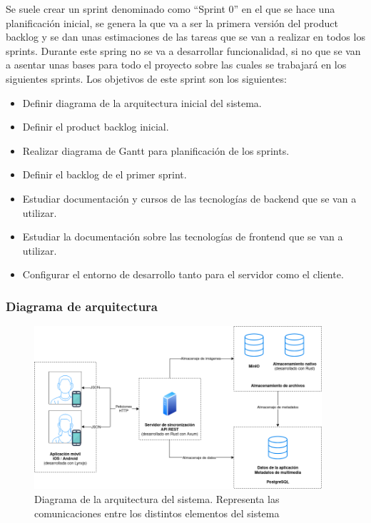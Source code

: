 Se suele crear un sprint denominado como ``Sprint 0'' en el que se hace una planificación inicial, se genera la que va a ser la primera versión del product backlog y se dan unas estimaciones de las tareas que se van a realizar en todos los sprints.
Durante este spring no se va a desarrollar funcionalidad, si no que se van a asentar unas bases para todo el proyecto sobre las cuales se trabajará en los siguientes sprints.
Los objetivos de este sprint son los siguientes:

\begin{itemize}
    \item Definir diagrama de la arquitectura inicial del sistema.
    \item Definir el product backlog inicial.
    \item Realizar diagrama de Gantt para planificación de los sprints.
    \item Definir el backlog de el primer sprint.
    \item Estudiar documentación y cursos de las tecnologías de backend que se van a utilizar.
    \item Estudiar la documentación sobre las tecnologías de frontend que se van a utilizar.
    \item Configurar el entorno de desarrollo tanto para el servidor como el cliente.
\end{itemize}

\subsubsection{Diagrama de arquitectura}
\begin{figure}[H]
    \begin{center}
        \includegraphics[width=0.95\textwidth]{images/diagrama-arquitectura.png}
    \end{center}
    \caption{Diagrama de la arquitectura del sistema. Representa las comunicaciones entre los distintos elementos del sistema}\label{fig:diagrama-arquitectura}
\end{figure}

